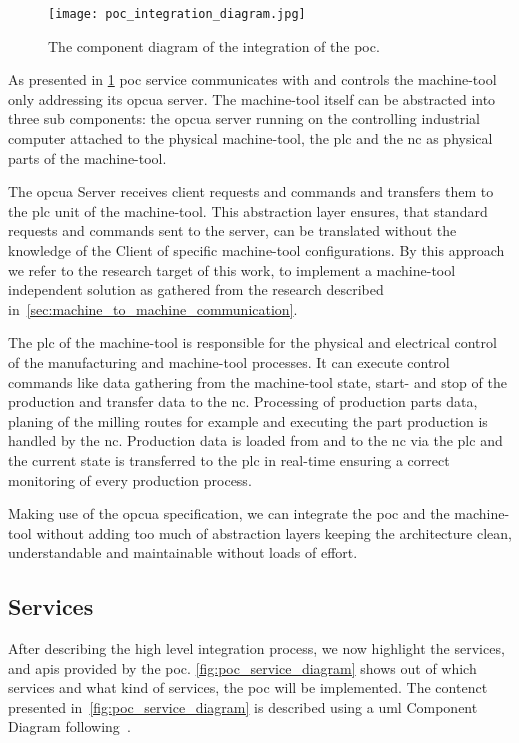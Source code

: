\documentclass[
a4paper,
twoside,
headsepline,
cleardoublepage=empty,
parskip=half,
draft=false
]{scrbook}
\begin{document}
				\begin{figure}[htbp]
					\centering
					\texttt{[image: poc\_integration\_diagram.jpg]}
					\caption{The component diagram of the integration of the \gls{poc}.}
					\label{fig:poc_integration_diagram}
				\end{figure}

				As presented in \cref{fig:poc_integration_diagram} \gls{poc} service communicates with and controls the machine-tool only addressing its \gls{opcua} server. The machine-tool itself can be abstracted into three sub components: the \gls{opcua} server running on the controlling industrial computer attached to the physical machine-tool, the \gls{plc} and the \gls{nc} as physical parts of the machine-tool.

				The \gls{opcua} Server receives client requests and commands and transfers them to the \gls{plc} unit of the machine-tool. This abstraction layer ensures, that standard requests and commands sent to the server, can be translated without the knowledge of the Client of specific machine-tool configurations.
				By this approach we refer to the research target of this work, to implement a machine-tool independent solution as gathered from the research described in~\cref{sec:machine_to_machine_communication}.

				The \gls{plc} of the machine-tool is responsible for the physical and electrical control of the manufacturing and machine-tool processes. It can execute control commands like data gathering from the machine-tool state, start- and stop of the production and transfer data to the \gls{nc}. Processing of production parts data, planing of the milling routes for example and executing the part production is handled by the \gls{nc}. Production data is loaded from and to the \gls{nc} via the \gls{plc} and the current state is transferred to the \gls{plc} in real-time ensuring a correct monitoring of every production process.

				Making use of the \gls{opcua} specification, we can integrate the \gls{poc} and the machine-tool without adding too much of abstraction layers keeping the architecture clean, understandable and maintainable without loads of effort.

			\subsection{Services} \label{subsec:services}

				After describing the high level integration process, we now highlight the services, and \gls{api}s provided by the \gls{poc}. \cref{fig:poc_service_diagram} shows out of which services and what kind of services, the \gls{poc} will be implemented. The contenct presented in~\cref{fig:poc_service_diagram} is described using a \gls{uml} Component Diagram following~\cite{uml2017}.
				
\end{document}
